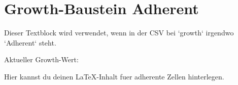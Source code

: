 \section*{Growth-Baustein Adherent}

Dieser Textblock wird verwendet, wenn in der CSV bei `growth` irgendwo `Adherent` steht.

Aktueller Growth-Wert:

\textbf{\Growth}

Hier kannst du deinen LaTeX-Inhalt fuer adherente Zellen hinterlegen.
